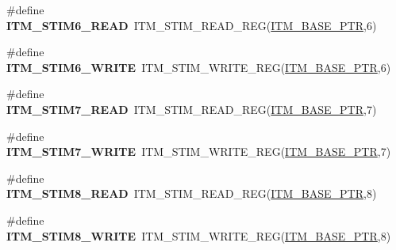 \begin{DoxyCompactItemize}
\item 
\hypertarget{group___i_t_m___register___accessor___macros_ga8a39db72396c8cd021762dbe2def218c}{}\#define {\bfseries I\+T\+M\+\_\+\+S\+T\+I\+M6\+\_\+\+R\+E\+A\+D}~I\+T\+M\+\_\+\+S\+T\+I\+M\+\_\+\+R\+E\+A\+D\+\_\+\+R\+E\+G(\hyperlink{group___i_t_m___peripheral_gafaddee8fe8b6a898d4e5edc43ee0d703}{I\+T\+M\+\_\+\+B\+A\+S\+E\+\_\+\+P\+T\+R},6)\label{group___i_t_m___register___accessor___macros_ga8a39db72396c8cd021762dbe2def218c}

\item 
\hypertarget{group___i_t_m___register___accessor___macros_gab5f100af2978bf54186d5754e9676f5d}{}\#define {\bfseries I\+T\+M\+\_\+\+S\+T\+I\+M6\+\_\+\+W\+R\+I\+T\+E}~I\+T\+M\+\_\+\+S\+T\+I\+M\+\_\+\+W\+R\+I\+T\+E\+\_\+\+R\+E\+G(\hyperlink{group___i_t_m___peripheral_gafaddee8fe8b6a898d4e5edc43ee0d703}{I\+T\+M\+\_\+\+B\+A\+S\+E\+\_\+\+P\+T\+R},6)\label{group___i_t_m___register___accessor___macros_gab5f100af2978bf54186d5754e9676f5d}

\item 
\hypertarget{group___i_t_m___register___accessor___macros_gad3fb2b38ef6a9727bd3036cf014f3d61}{}\#define {\bfseries I\+T\+M\+\_\+\+S\+T\+I\+M7\+\_\+\+R\+E\+A\+D}~I\+T\+M\+\_\+\+S\+T\+I\+M\+\_\+\+R\+E\+A\+D\+\_\+\+R\+E\+G(\hyperlink{group___i_t_m___peripheral_gafaddee8fe8b6a898d4e5edc43ee0d703}{I\+T\+M\+\_\+\+B\+A\+S\+E\+\_\+\+P\+T\+R},7)\label{group___i_t_m___register___accessor___macros_gad3fb2b38ef6a9727bd3036cf014f3d61}

\item 
\hypertarget{group___i_t_m___register___accessor___macros_ga5a34eadd8072ebc43f50398cb76171af}{}\#define {\bfseries I\+T\+M\+\_\+\+S\+T\+I\+M7\+\_\+\+W\+R\+I\+T\+E}~I\+T\+M\+\_\+\+S\+T\+I\+M\+\_\+\+W\+R\+I\+T\+E\+\_\+\+R\+E\+G(\hyperlink{group___i_t_m___peripheral_gafaddee8fe8b6a898d4e5edc43ee0d703}{I\+T\+M\+\_\+\+B\+A\+S\+E\+\_\+\+P\+T\+R},7)\label{group___i_t_m___register___accessor___macros_ga5a34eadd8072ebc43f50398cb76171af}

\item 
\hypertarget{group___i_t_m___register___accessor___macros_ga84e344ea9bb6dd044130f918d1cd3f59}{}\#define {\bfseries I\+T\+M\+\_\+\+S\+T\+I\+M8\+\_\+\+R\+E\+A\+D}~I\+T\+M\+\_\+\+S\+T\+I\+M\+\_\+\+R\+E\+A\+D\+\_\+\+R\+E\+G(\hyperlink{group___i_t_m___peripheral_gafaddee8fe8b6a898d4e5edc43ee0d703}{I\+T\+M\+\_\+\+B\+A\+S\+E\+\_\+\+P\+T\+R},8)\label{group___i_t_m___register___accessor___macros_ga84e344ea9bb6dd044130f918d1cd3f59}

\item 
\hypertarget{group___i_t_m___register___accessor___macros_ga90288fe5645ad72d65bcf25a4e48cc23}{}\#define {\bfseries I\+T\+M\+\_\+\+S\+T\+I\+M8\+\_\+\+W\+R\+I\+T\+E}~I\+T\+M\+\_\+\+S\+T\+I\+M\+\_\+\+W\+R\+I\+T\+E\+\_\+\+R\+E\+G(\hyperlink{group___i_t_m___peripheral_gafaddee8fe8b6a898d4e5edc43ee0d703}{I\+T\+M\+\_\+\+B\+A\+S\+E\+\_\+\+P\+T\+R},8)\label{group___i_t_m___register___accessor___macros_ga90288fe5645ad72d65bcf25a4e48cc23}


\end{DoxyCompactItemize}
